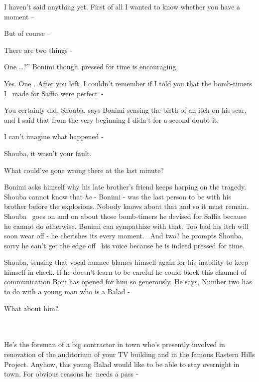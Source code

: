 \documentclass[letterpaper]{article}
\begin{document}
{\textquotedbl}I haven't said anything yet. First of all I wanted to know whether you have a moment --{\textquotedbl}

{\textquotedbl}But of course --{\textquotedbl} 

{\textquotedbl}There are two things -{\textquotedbl}

{\textquotedbl}One {\dots}?'' Bonimi though~pressed for time is encouraging. 

{\textquotedbl}Yes. One . After you left, I couldn't remember if I told you that the bomb-timers I \ made for Saffia
were perfect~-{\textquotedbl} 

{\textquotedbl}You certainly did, Shouba,{\textquotedbl} says Bonimi sensing the birth of an itch on his scar,
{\textquotedbl}and I said that from the very beginning I didn't for a second doubt it.{\textquotedbl}

{\textquotedbl}I can't imagine what happened -{\textquotedbl} 

{\textquotedbl}Shouba, it wasn't your fault.{\textquotedbl} 

{\textquotedbl}What could've gone wrong there at the last minute?{\textquotedbl}

Bonimi asks himself why his late brother's friend keeps harping on the tragedy. Shouba cannot know that \textit{he} -
Bonimi - was the last person to be with his brother before the explosions. Nobody knows about that and so it must
remain. Shouba~ goes on and on about those bomb-timers he devised for Saffia because he cannot do otherwise. Bonimi can
sympathize with that. Too bad his itch will soon wear off - he cherishes its every moment. ~{\textquotedbl}And
two?{\textquotedbl} he prompts Shouba, sorry he can't get the edge off \ his voice because he is indeed pressed for
time.

Shouba, sensing that vocal nuance blames himself again for his inability to keep himself in check. If he doesn't learn
to be careful he could block this channel of communication Boni has opened for him so generously. He says,
{\textquotedbl}Number two has to do with a young man who is a Balad -{\textquotedbl}

{\textquotedbl}What about him?{\textquotedbl}
~~~~~~~~~~~~~~~~~~~~~~~~~~~~~~~~~~~~~~~~~~~~~~~~~~~~~~~~~~~~~~~~~~~~~~~~~~~~~~ 

{\textquotedbl}He's the foreman of a big contractor in town who's presently involved in renovation of the auditorium of
your TV building and in the famous Eastern Hills Project. Anyhow, this young Balad would like to be able to stay
overnight in town. For obvious reasons he~needs a pass -{\textquotedbl}
\end{document}
